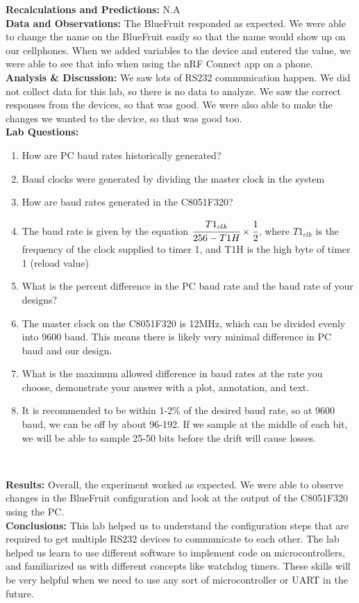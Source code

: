 \documentclass{article}
\newcommand{\Q}{\textbf{Q:}}
\newcommand{\A}{\textbf{A:}}
\begin{document}
\noindent\textbf{Recalculations and Predictions:} N.A\\

\noindent\textbf{Data and Observations:} The BlueFruit responded as expected. We were able to change the name on the BlueFruit easily so that the name would show up on our cellphones. When we added variables to the device and entered the value, we were able to see that info when using the nRF Connect app on a phone.\\

\noindent\textbf{Analysis \& Discussion:} We saw lots of RS232 communication happen. We did not collect data for this lab, so there is no data to analyze. We saw the correct responses from the devices, so that was good. We were also able to make the changes we wanted to the device, so that was good too.\\

\noindent\textbf{Lab Questions:}

\begin{enumerate}
	\item[\Q] How are PC baud rates historically generated?
	\item[\A] Baud clocks were generated by dividing the master clock in the system
	\item[\Q] How are baud rates generated in the C8051F320?
	\item[\A] The baud rate is given by the equation $\cfrac{T1_{clk}}{256-T1H} \times \cfrac{1}{2}$, where $T1_{clk}$ is the frequency of the clock supplied to timer 1, and T1H is the high byte of timer 1 (reload value)
	\item[\Q] What is the percent difference in the PC baud rate and the baud rate of your designs?
	\item[\A] The master clock on the C8051F320 is 12MHz, which can be divided evenly into 9600 baud. This means there is likely very minimal difference in PC baud and our design.
	\item[\Q] What is the maximum allowed difference in baud rates at the rate you choose, demonstrate your answer with a plot, annotation, and text.
	\item[\A] It is recommended to be within 1-2\% of the desired baud rate, so at 9600 baud, we can be off by about 96-192. If we sample at the middle of each bit, we will be able to sample 25-50 bits before the drift will cause losses. 
\end{enumerate}~

\noindent\textbf{Results:} Overall, the experiment worked as expected. We were able to observe changes in the BlueFruit configuration and look at the output of the C8051F320 using the PC.\\

\noindent\textbf{Conclusions:} This lab helped us to understand the configuration steps that are required to get multiple RS232 devices to communicate to each other. The lab helped us learn to use different software to implement code on microcontrollers, and familiarized us with different concepts like watchdog timers. These skills will be very helpful when we need to use any sort of microcontroller or UART in the future.
\end{document}

